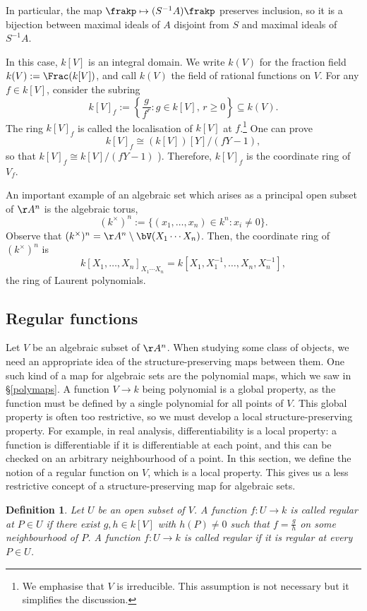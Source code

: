 \documentclass[12pt]{amsart}
\theoremstyle{plain}
\newtheorem{definition}[theorem]{Definition}
\begin{document}
In particular, the map $\frakp \mapsto (S^{-1}A) \frakp$ preserves inclusion, so it is a bijection between maximal ideals of $A$ disjoint from $S$ and maximal ideals of $S^{-1}A$.

In this case, $k[V]$ is an integral domain.
We write $k(V)$ for the fraction field $k(V):=\Frac(k[V])$, and call $k(V)$ the field of rational functions on $V$.
For any $f \in k[V]$, consider the subring
$$k[V]_f := \left\{\frac{g}{f^r} : g \in k[V], \, r \ge 0\right\} \subseteq k(V).$$
The ring $k[V]_f$ is called the localisation of $k[V]$ at $f$.\footnote{We emphasise that $V$ is irreducible. This assumption is not necessary but it simplifies the discussion.}
One can prove 
$$k[V]_f \cong (k[V])[Y] / (f Y -1),$$
so that $k[V]_f \cong k[V]/(fY-1)$ \cite[Lemma 1.13]{Milne13}).
Therefore, $k[V]_f$ is the coordinate ring of $V_f$.

An important example of an algebraic set which arises as a principal open subset of $\AA^n$ is the algebraic torus,
$$(k^\times)^n := \{(x_1, \ldots, x_n) \in k^n : x_i \ne 0\}.$$
Observe that $(k^\times)^n = \AA^n \setminus \bV(X_1 \cdots X_n)$.
Then, the coordinate ring of $(k^\times)^n$ is 
$$k[X_1, \ldots, X_n]_{X_1 \cdots X_n} = k[X_1, X_1^{-1}, \ldots, X_n, X_n^{-1}],$$
the ring of Laurent polynomials.

\subsection{Regular functions}
Let $V$ be an algebraic subset of $\AA^n$.
When studying some class of objects, we need an appropriate idea of the structure-preserving maps between them.
One such kind of a map for algebraic sets are the polynomial maps, which we saw in \S \ref{polymaps}.
A function $V \to k$ being polynomial is a global property, as the function must be defined by a single polynomial for all points of $V$.
This global property is often too restrictive, so we must develop a local structure-preserving property.
For example, in real analysis, differentiability is a local property: a function is differentiable if it is differentiable at each point, and this can be checked on an arbitrary neighbourhood of a point.
In this section, we define the notion of a regular function on $V$, which is a local property.
This gives us a less restrictive concept of a structure-preserving map for algebraic sets.

\begin{definition}
Let $U$ be an open subset of $V$.
A function $f : U \to k$ is called regular at $P \in U$ if there exist $g, h \in k[V]$ with $h(P)\ne 0$ such that $f = \frac{g}{h}$ on some neighbourhood of $P$.
A function $f:U\to k$ is called regular if it is regular at every $P \in U$.
\end{definition}
\end{document}
